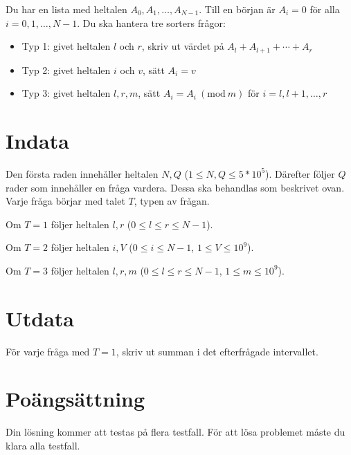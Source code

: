 \newcommand{\Mod}[1]{\ (\mathrm{mod}\ #1)}

Du har en lista med heltalen $A_0, A_1, \dots, A_{N-1}$. Till en början är $A_i=0$ för alla $i=0,1,\dots,N-1$.
Du ska hantera tre sorters frågor:

\begin{itemize}
    \item Typ 1: givet heltalen $l$ och $r$, skriv ut värdet på  $A_l + A_{l+1} + \cdots + A_{r}$
    \item Typ 2: givet heltalen $i$ och $v$, sätt $A_i=v$
    \item Typ 3: givet heltalen $l,r,m$, sätt $A_i=A_i \Mod{m}$ för $i=l,l+1,\dots,r$
\end{itemize}

\section*{Indata}
Den första raden innehåller heltalen $N, Q$ ($1 \leq N, Q \leq 5*10^5$).
Därefter följer $Q$ rader som innehåller en fråga vardera. Dessa ska behandlas som beskrivet ovan.
Varje fråga börjar med talet $T$, typen av frågan.

Om $T=1$ följer heltalen $l,r$ ($0 \leq l \leq r \leq N - 1$).

Om $T=2$ följer heltalen $i, V$ ($0 \leq i \leq N - 1$, $1 \leq V \leq 10^9$).

Om $T=3$ följer heltalen $l,r,m$ ($0 \leq l \leq r \leq N-1$, $1 \leq m \leq 10^9$).

\section*{Utdata}
För varje fråga med $T=1$, skriv ut summan i det efterfrågade intervallet.

\section*{Poängsättning}
Din lösning kommer att testas på flera testfall.
\noindent
För att lösa problemet måste du klara alla testfall.
